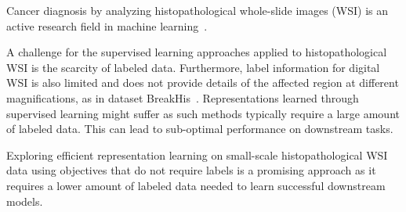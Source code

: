 \documentclass[conference]{IEEEtran}
\begin{document}
\begin{comment}

Automated detection of cancerous tissue from images has been an active research field for several decades~\cite{suzuki1992development}.
Machine learning has been a powerful tool, and in the last decade, deep learning has enabled great strides in the field~\cite{komura2018machine}.
Cancer diagnosis by analyzing histopathological images is established as a very challenging task in computer vision.
Given huge variability in the appearance of tissues, images are acquired on different optical magnifications, which imposes troubles in learning the representations.
Further, the scarcity of such data, specially annotated data, makes it more challenging to obtain state-of-the-art performance.

This work investigates label efficient representation learning and proposes a novel self-supervised method, Magnification Prior Contrastive Similarity (MPCS), to learn efficient representations of unlabeled histopathological images. 
The proposed method formulates contrastive similarity by exploiting magnification prior and inductive transfer, enabling learning representations on small-scale datasets. 
Further, learned representations are exploited to accomplish the tasks of malignancy classification. A complete approach is depicted in Figure~\ref{fig:mpcs_intro} 

Following are the main contributions of the work:
\end{comment}


Cancer diagnosis by analyzing histopathological whole-slide images (WSI) is an active research field in machine learning~\cite{komura2018machine}.





A challenge for the supervised learning approaches applied to histopathological WSI is the scarcity of labeled data.
Furthermore, label information for digital WSI is also limited and does not provide details of the affected region at different magnifications, as in dataset BreakHis~\cite{spanhol2016dataset}.
Representations learned through supervised learning might suffer as such methods typically require a large amount of labeled data.
This can lead to sub-optimal performance on downstream tasks.


Exploring efficient representation learning on small-scale histopathological WSI data using objectives that do not require labels is a promising approach as it requires a lower amount of labeled data needed to learn successful downstream models.
\end{document}
